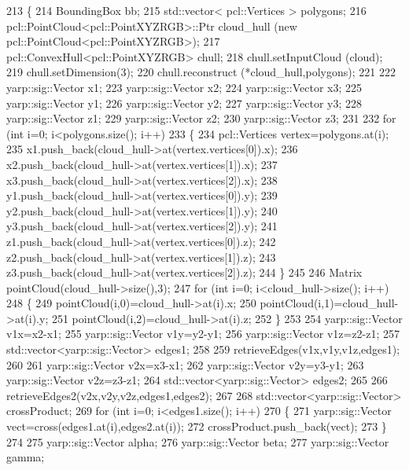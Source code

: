 \begin{DoxyCode}
213 \{
214     BoundingBox bb;
215     std::vector< pcl::Vertices > polygons;
216     pcl::PointCloud<pcl::PointXYZRGB>::Ptr cloud\_hull (\textcolor{keyword}{new} pcl::PointCloud<pcl::PointXYZRGB>);
217     pcl::ConvexHull<pcl::PointXYZRGB> chull;
218     chull.setInputCloud (cloud);
219     chull.setDimension(3);
220     chull.reconstruct (*cloud\_hull,polygons);
221 
222     yarp::sig::Vector x1;
223     yarp::sig::Vector x2;
224     yarp::sig::Vector x3;
225     yarp::sig::Vector y1;
226     yarp::sig::Vector y2;
227     yarp::sig::Vector y3;
228     yarp::sig::Vector z1;
229     yarp::sig::Vector z2;
230     yarp::sig::Vector z3;
231 
232     \textcolor{keywordflow}{for} (\textcolor{keywordtype}{int} i=0; i<polygons.size(); i++)
233     \{
234         pcl::Vertices vertex=polygons.at(i);
235         x1.push\_back(cloud\_hull->at(vertex.vertices[0]).x);
236         x2.push\_back(cloud\_hull->at(vertex.vertices[1]).x);
237         x3.push\_back(cloud\_hull->at(vertex.vertices[2]).x);
238         y1.push\_back(cloud\_hull->at(vertex.vertices[0]).y);
239         y2.push\_back(cloud\_hull->at(vertex.vertices[1]).y);
240         y3.push\_back(cloud\_hull->at(vertex.vertices[2]).y);
241         z1.push\_back(cloud\_hull->at(vertex.vertices[0]).z);
242         z2.push\_back(cloud\_hull->at(vertex.vertices[1]).z);
243         z3.push\_back(cloud\_hull->at(vertex.vertices[2]).z);
244     \}
245 
246     Matrix pointCloud(cloud\_hull->size(),3);
247     \textcolor{keywordflow}{for} (\textcolor{keywordtype}{int} i=0; i<cloud\_hull->size(); i++)
248     \{
249         pointCloud(i,0)=cloud\_hull->at(i).x;
250         pointCloud(i,1)=cloud\_hull->at(i).y;
251         pointCloud(i,2)=cloud\_hull->at(i).z;
252     \}
253 
254     yarp::sig::Vector v1x=x2-x1;
255     yarp::sig::Vector v1y=y2-y1;
256     yarp::sig::Vector v1z=z2-z1;
257     std::vector<yarp::sig::Vector> edges1;
258 
259     retrieveEdges(v1x,v1y,v1z,edges1);
260 
261     yarp::sig::Vector v2x=x3-x1;
262     yarp::sig::Vector v2y=y3-y1;
263     yarp::sig::Vector v2z=z3-z1;
264     std::vector<yarp::sig::Vector> edges2;
265 
266     retrieveEdges2(v2x,v2y,v2z,edges1,edges2);
267 
268     std::vector<yarp::sig::Vector> crossProduct;
269     \textcolor{keywordflow}{for} (\textcolor{keywordtype}{int} i=0; i<edges1.size(); i++)
270     \{
271         yarp::sig::Vector vect=cross(edges1.at(i),edges2.at(i));
272         crossProduct.push\_back(vect);
273     \}
274 
275     yarp::sig::Vector alpha;
276     yarp::sig::Vector beta;
277     yarp::sig::Vector gamma;

\end{DoxyCode}
